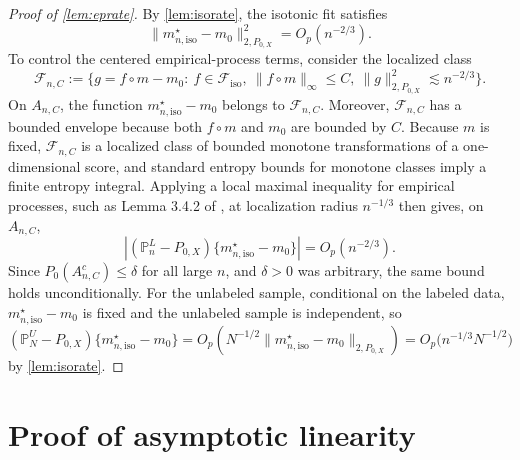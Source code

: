 \documentclass{article}
\theoremstyle{plain}
\theoremstyle{definition}
\newcommand{\1}{\mathbbm{1}}
\newcommand{\mhat}{m}
\newcommand{\Pl}{\mathbb{P}^{L}_n}
\newcommand{\Pu}{\mathbb{P}^{U}_N}
\newcommand{\Px}{P_{0,X}}
\begin{document}
\begin{proof}[Proof of \cref{lem:eprate}]
By \cref{lem:isorate}, the isotonic fit satisfies
\[
\|m_{n,\mathrm{iso}}^\star-m_0\|_{2,\Px}^2=O_p(n^{-2/3}).
\]
To control the centered empirical-process terms, consider the localized class
\[
\mathcal F_{n,C}:=\{g=f\circ\mhat-m_0:\ f\in\mathcal F_{\mathrm{iso}},\ \|f\circ\mhat\|_\infty\le C,\ \|g\|_{2,\Px}^2\lesssim n^{-2/3}\}.
\]
On \(A_{n,C}\), the function \(m_{n,\mathrm{iso}}^\star-m_0\) belongs to \(\mathcal F_{n,C}\). Moreover, \(\mathcal F_{n,C}\) has a bounded envelope because both \(f\circ\mhat\) and \(m_0\) are bounded by \(C\). Because \(\mhat\) is fixed, \(\mathcal F_{n,C}\) is a localized class of bounded monotone transformations of a one-dimensional score, and standard entropy bounds for monotone classes imply a finite entropy integral. Applying a local maximal inequality for empirical processes, such as Lemma 3.4.2 of \citet{vdvwellner1996}, at localization radius \(n^{-1/3}\) then gives, on \(A_{n,C}\),
\[
|(\Pl-\Px)\{m_{n,\mathrm{iso}}^\star-m_0\}|=O_p(n^{-2/3}).
\]
Since \(P_0(A_{n,C}^c)\le \delta\) for all large \(n\), and \(\delta>0\) was arbitrary, the same bound holds unconditionally.
For the unlabeled sample, conditional on the labeled data, \(m_{n,\mathrm{iso}}^\star-m_0\) is fixed and the unlabeled sample is independent, so
\[
(\Pu-\Px)\{m_{n,\mathrm{iso}}^\star-m_0\}
=
O_p\left(N^{-1/2}\|m_{n,\mathrm{iso}}^\star-m_0\|_{2,\Px}\right)
=
O_p\bigl(n^{-1/3}N^{-1/2}\bigr)
\]
by \cref{lem:isorate}.
\end{proof}

\section{Proof of asymptotic linearity}
\label{app:al}
\end{document}

